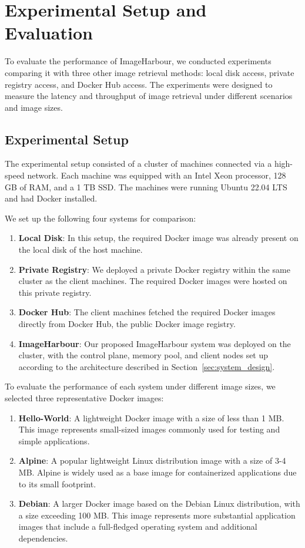 \section{Experimental Setup and Evaluation}
To evaluate the performance of ImageHarbour, we conducted experiments comparing it with three other image retrieval methods: local disk access, private registry access, and Docker Hub access. The experiments were designed to measure the latency and throughput of image retrieval under different scenarios and image sizes.

\subsection{Experimental Setup}
The experimental setup consisted of a cluster of machines connected via a high-speed network. Each machine was equipped with an Intel Xeon processor, 128 GB of RAM, and a 1 TB SSD. The machines were running Ubuntu 22.04 LTS and had Docker installed.

We set up the following four systems for comparison:

\begin{enumerate}
    \item \textbf{Local Disk}: In this setup, the required Docker image was already present on the local disk of the host machine.
    \item \textbf{Private Registry}: We deployed a private Docker registry within the same cluster as the client machines. The required Docker images were hosted on this private registry.
    \item \textbf{Docker Hub}: The client machines fetched the required Docker images directly from Docker Hub, the public Docker image registry.
    \item \textbf{ImageHarbour}: Our proposed ImageHarbour system was deployed on the cluster, with the control plane, memory pool, and client nodes set up according to the architecture described in Section~\ref{sec:system_design}.
\end{enumerate}

To evaluate the performance of each system under different image sizes, we selected three representative Docker images:

\begin{enumerate}
    \item \textbf{Hello-World}: A lightweight Docker image with a size of less than 1 MB. This image represents small-sized images commonly used for testing and simple applications.
    \item \textbf{Alpine}: A popular lightweight Linux distribution image with a size of 3-4 MB. Alpine is widely used as a base image for containerized applications due to its small footprint.
    \item \textbf{Debian}: A larger Docker image based on the Debian Linux distribution, with a size exceeding 100 MB. This image represents more substantial application images that include a full-fledged operating system and additional dependencies.
\end{enumerate}

